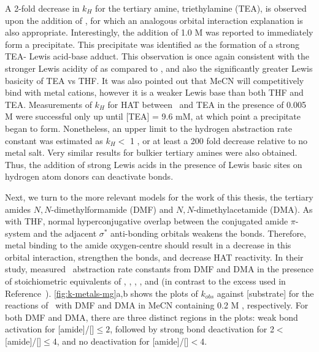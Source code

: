 \begin{doublespace}
A 2-fold decrease in $k_H$ for the tertiary amine, triethylamine (TEA), is
observed upon the addition of , for which an analogous orbital
interaction explanation is also appropriate. Interestingly, the addition of 1.0
M  was reported to immediately form a precipitate. This
precipitate was identified as the formation of a strong TEA- Lewis
acid-base adduct. This observation is once again consistent with the stronger
Lewis acidity of  as compared to , and also the
significantly greater Lewis basicity of TEA vs THF.\cite{Salamone2013a,
Reichardt2010} It was also pointed out that MeCN will competitively bind with
metal cations, however it is a weaker Lewis base than both THF and TEA.
Measurements of $k_H$ for HAT between \cumo\ and TEA in the presence of 0.005 M
 were successful only up until [TEA] = 9.6 mM, at which point a
precipitate began to form. Nonetheless, an upper limit to the hydrogen
abstraction rate constant was estimated as $k_H <$ 1 \Ms, or at least a 200
fold decrease relative to no metal salt. Very similar results for bulkier
tertiary amines were also obtained. Thus, the addition of strong Lewis acids in
the presence of Lewis basic sites on hydrogen atom donors can deactivate
 bonds.

Next, we turn to the more relevant models for the work of this thesis, the
tertiary amides $N,N$-dimethylformamide (DMF) and $N,N$-dimethylacetamide (DMA).
As with THF, normal hyperconjugative overlap between the conjugated amide
$\pi$-system and the adjacent  $\sigma^*$ anti-bonding orbitals weakens
the  bonds. Therefore, metal binding to the amide oxygen-centre should
result in a decrease in this orbital interaction, strengthen the  bonds,
and decrease HAT reactivity. In their study, \citet{Salamone2015metals} measured
\cumo\ abstraction rate constants from DMF and DMA in the presence of
stoichiometric equivalents of , , ,
, and  (in contrast to the excess used in
Reference~). \ref{fig:k-metals-mg}a,b shows the plots of
$k_{obs}$ against [substrate] for the reactions of \cumo\ with DMF and DMA in
MeCN containing 0.2 M , respectively. For both DMF and DMA, there
are three distinct regions in the plots: weak  bond activation for
[amide]/[]$\leq 2$, followed by strong  bond deactivation
for 2$<$[amide]/[]$\leq$4, and no deactivation for
[amide]/[]$<$4.


\end{doublespace}
